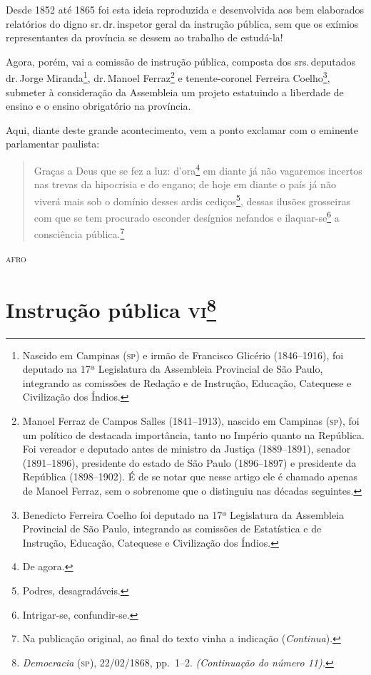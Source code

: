 Desde 1852 até 1865 foi esta ideia reproduzida e desenvolvida aos bem
elaborados relatórios do digno sr.\,dr.\,inspetor geral da instrução
pública, sem que os exímios representantes da província se dessem ao
trabalho de estudá-la!

Agora, porém, vai a comissão de instrução pública, composta dos srs.\,deputados dr.\,Jorge Miranda\footnote{Nascido em Campinas (\textsc{sp}) e irmão
  de Francisco Glicério (1846--1916), foi deputado na 17ª Legislatura da
  Assembleia Provincial de São Paulo, integrando as comissões de Redação
  e de Instrução, Educação, Catequese e Civilização dos Índios.}, dr.\,Manoel Ferraz\footnote{Manoel Ferraz de Campos Salles (1841--1913),
  nascido em Campinas (\textsc{sp}), foi um político de destacada importância,
  tanto no Império quanto na República. Foi vereador e deputado antes de
  ministro da Justiça (1889--1891), senador (1891--1896), presidente do
  estado de São Paulo (1896--1897) e presidente da República (1898--1902).
  É de se notar que nesse artigo ele é chamado apenas de Manoel Ferraz,
  sem o sobrenome que o distinguiu nas décadas seguintes.} e
tenente-coronel Ferreira Coelho\footnote{Benedicto Ferreira Coelho foi
  deputado na 17ª Legislatura da Assembleia Provincial de São Paulo,
  integrando as comissões de Estatística e de Instrução, Educação,
  Catequese e Civilização dos Índios.}, submeter à consideração da
Assembleia um projeto estatuindo a liberdade de ensino e o ensino
obrigatório na província.

Aqui, diante deste grande acontecimento, vem a ponto exclamar com o
eminente parlamentar paulista:

\begin{quote}
Graças a Deus que se fez a luz: d'ora\footnote{De agora.} em diante
já não vagaremos incertos nas trevas da hipocrisia e do engano; de hoje
em diante o país já não viverá mais sob o domínio desses ardis
cediços\footnote{Podres, desagradáveis.}, dessas ilusões grosseiras
com que se tem procurado esconder desígnios nefandos e
ilaquar-se\footnote{Intrigar-se, confundir-se.} a consciência
pública.\footnote{Na publicação original, ao final do texto vinha a indicação (\emph{Continua}).}
\end{quote}

\begin{flushright}
\textsc{afro}
\end{flushright}

\chapter{Instrução pública \textsc{vi}\footnote{\emph{Democracia} (\textsc{sp}),
  22/02/1868, pp.~1--2. \emph{(Continuação do número 11).}}}

